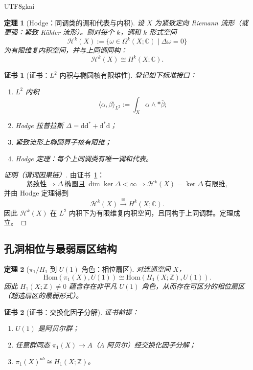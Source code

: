 \documentclass[12pt]{article}
\newtheorem{theorem}{定理}[section]
\newtheorem{Certificate}{证书}[section]
\newcommand{\dd}{\mathrm{d}}
\begin{document}
\begin{CJK*}{UTF8}{gkai}
\begin{theorem}[Hodge：同调类的调和代表与内积]
\label{thm:T2}
设 $X$ 为紧致定向 Riemann 流形（或更强：紧致 K\"ahler 流形）。则对每个 $k$，调和 $k$ 形式空间
\[
\mathcal H^k(X):=\{\omega\in\Omega^k(X;\mathbb C)\mid \Delta\omega=0\}
\]
为有限维复内积空间，并与上同调同构：
\[
\mathcal H^k(X)\cong H^k(X;\mathbb C).
\]
\end{theorem}

\begin{Certificate}[证书：$L^2$ 内积与椭圆核有限维性]
\label{cert:T2}
登记如下标准接口：
\begin{enumerate}
\item $L^2$ 内积
\[
\langle \alpha,\beta\rangle_{L^2}:=\int_X \alpha\wedge *\overline{\beta};
\]
\item Hodge 拉普拉斯 $\Delta=\dd\dd^\ast+\dd^\ast\dd$；
\item 紧致流形上椭圆算子核有限维；
\item Hodge 定理：每个上同调类有唯一调和代表。
\end{enumerate}
\end{Certificate}

\begin{proof}[证明（谓词因果链）]
由证书~\ref{cert:T2}：
\[
\text{紧致性}
\Rightarrow
\Delta\ \text{椭圆且}\ \dim\ker\Delta<\infty
\Rightarrow
\mathcal H^k(X)=\ker\Delta\ \text{有限维},
\]
并由 Hodge 定理得到
\[
\mathcal H^k(X)\xrightarrow{\ \cong\ }H^k(X;\mathbb C).
\]
因此 $\mathcal H^k(X)$ 在 $L^2$ 内积下为有限维复内积空间，且同构于上同调群。定理成立。
\end{proof}

\subsection{孔洞相位与最弱扇区结构}

\begin{theorem}[$\pi_1/H_1$ 到 $U(1)$ 角色：相位扇区]
\label{thm:T3}
对连通空间 $X$，
\[
\mathrm{Hom}(\pi_1(X),U(1))\cong \mathrm{Hom}(H_1(X;\mathbb Z),U(1)).
\]
因此 $H_1(X;\mathbb Z)\neq 0$ 蕴含存在非平凡 $U(1)$ 角色，从而存在可区分的相位扇区（超选扇区的最弱形式）。
\end{theorem}

\begin{Certificate}[证书：交换化因子分解]
\label{cert:T3}
证书前提：
\begin{enumerate}
\item $U(1)$ 是阿贝尔群；
\item 任意群同态 $\pi_1(X)\to A$（$A$ 阿贝尔）经交换化因子分解；
\item $\pi_1(X)^{ab}\cong H_1(X;\mathbb Z)$。
\end{enumerate}
\end{Certificate}


\end{CJK*}
\end{document}
